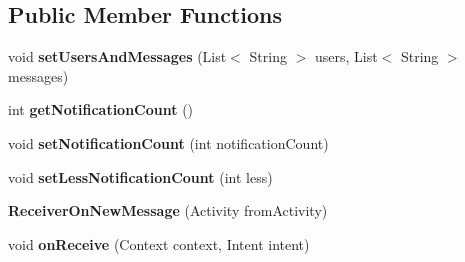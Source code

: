 \subsection*{Public Member Functions}
\begin{DoxyCompactItemize}
\item 
void {\bfseries set\+Users\+And\+Messages} (List$<$ String $>$ users, List$<$ String $>$ messages)\hypertarget{classcom_1_1example_1_1sebastian_1_1tindertp_1_1services_1_1ReceiverOnNewMessage_aec467b28bd0cfde2bfd7962b4b1888eb}{}\label{classcom_1_1example_1_1sebastian_1_1tindertp_1_1services_1_1ReceiverOnNewMessage_aec467b28bd0cfde2bfd7962b4b1888eb}

\item 
int {\bfseries get\+Notification\+Count} ()\hypertarget{classcom_1_1example_1_1sebastian_1_1tindertp_1_1services_1_1ReceiverOnNewMessage_abca1ae9d3b52f7dca07d7276019303e6}{}\label{classcom_1_1example_1_1sebastian_1_1tindertp_1_1services_1_1ReceiverOnNewMessage_abca1ae9d3b52f7dca07d7276019303e6}

\item 
void {\bfseries set\+Notification\+Count} (int notification\+Count)\hypertarget{classcom_1_1example_1_1sebastian_1_1tindertp_1_1services_1_1ReceiverOnNewMessage_a17691b74e35e91320217b6d8bf6a0ca3}{}\label{classcom_1_1example_1_1sebastian_1_1tindertp_1_1services_1_1ReceiverOnNewMessage_a17691b74e35e91320217b6d8bf6a0ca3}

\item 
void {\bfseries set\+Less\+Notification\+Count} (int less)\hypertarget{classcom_1_1example_1_1sebastian_1_1tindertp_1_1services_1_1ReceiverOnNewMessage_a0c4e91bcbad4c762c16779ed203748a9}{}\label{classcom_1_1example_1_1sebastian_1_1tindertp_1_1services_1_1ReceiverOnNewMessage_a0c4e91bcbad4c762c16779ed203748a9}

\item 
{\bfseries Receiver\+On\+New\+Message} (Activity from\+Activity)\hypertarget{classcom_1_1example_1_1sebastian_1_1tindertp_1_1services_1_1ReceiverOnNewMessage_ad9cfc2c0d4dbb0baab3a0c6e846359c3}{}\label{classcom_1_1example_1_1sebastian_1_1tindertp_1_1services_1_1ReceiverOnNewMessage_ad9cfc2c0d4dbb0baab3a0c6e846359c3}

\item 
void {\bfseries on\+Receive} (Context context, Intent intent)\hypertarget{classcom_1_1example_1_1sebastian_1_1tindertp_1_1services_1_1ReceiverOnNewMessage_a431e4c2775f98c60f4481cabc604ac8a}{}\label{classcom_1_1example_1_1sebastian_1_1tindertp_1_1services_1_1ReceiverOnNewMessage_a431e4c2775f98c60f4481cabc604ac8a}

\end{DoxyCompactItemize}
